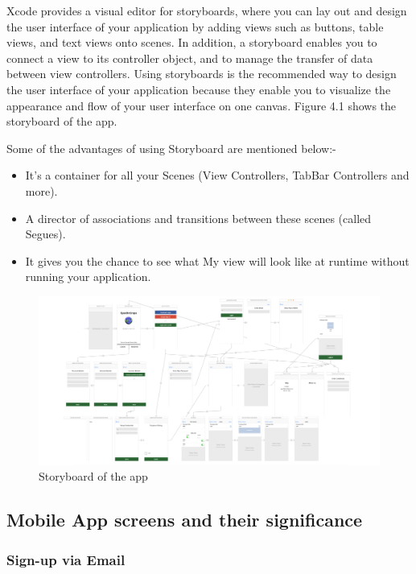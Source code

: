 Xcode provides a visual editor for storyboards, where you can lay out and design the user interface of your application by adding views such as buttons, table views, and text views onto scenes. In addition, a storyboard enables you to connect a view to its controller object, and to manage the transfer of data between view controllers. Using storyboards is the recommended way to design the user interface of your application because they enable you to visualize the appearance and flow of your user interface on one canvas. Figure 4.1 shows the storyboard of the app. 

Some of the advantages of using Storyboard are mentioned below:-
\begin{itemize}
    \item It's a container for all your Scenes (View Controllers, TabBar Controllers and more).
    \item A director of associations and transitions between these scenes (called Segues).
    \item It gives you the chance to see what My view will look like at runtime without running your application.
\end{itemize}

\newpage

    \begin{figure}[H]
            \centering
            \includegraphics[width=\linewidth]{figures/ch4/storyboard_2.png}
            \caption{\label{fig:wireframe_3} Storyboard of the app}
    \end{figure}
    
\subsection{Mobile App screens and their significance}

\subsubsection{Sign-up via Email}


